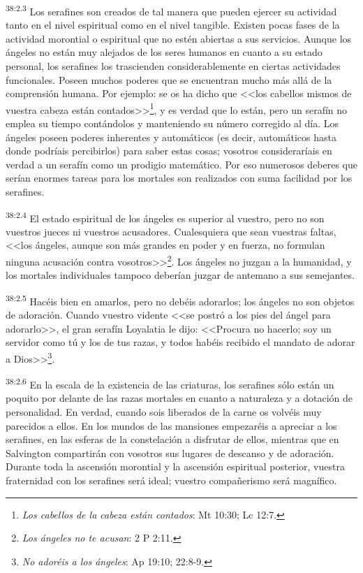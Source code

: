\par
\textsuperscript{38:2.3} Los serafines son creados de tal manera que pueden ejercer su actividad tanto en el nivel espiritual como en el nivel tangible. Existen pocas fases de la actividad morontial o espiritual que no estén abiertas a sus servicios. Aunque los ángeles no están muy alejados de los seres humanos en cuanto a su estado personal, los serafines los trascienden considerablemente en ciertas actividades funcionales. Poseen muchos poderes que se encuentran mucho más allá de la comprensión humana. Por ejemplo: se os ha dicho que <<los cabellos mismos de vuestra cabeza están contados>>\footnote{\textit{Los cabellos de la cabeza están contados}: Mt 10:30; Lc 12:7.}, y es verdad que lo están, pero un serafín no emplea su tiempo contándolos y manteniendo su número corregido al día. Los ángeles poseen poderes inherentes y automáticos (es decir, automáticos hasta donde podríais percibirlos) para saber estas cosas; vosotros consideraríais en verdad a un serafín como un prodigio matemático. Por eso numerosos deberes que serían enormes tareas para los mortales son realizados con suma facilidad por los serafines.

\par
\textsuperscript{38:2.4} El estado espiritual de los ángeles es superior al vuestro, pero no son vuestros jueces ni vuestros acusadores. Cualesquiera que sean vuestras faltas, <<los ángeles, aunque son más grandes en poder y en fuerza, no formulan ninguna acusación contra vosotros>>\footnote{\textit{Los ángeles no te acusan}: 2 P 2:11.}. Los ángeles no juzgan a la humanidad, y los mortales individuales tampoco deberían juzgar de antemano a sus semejantes.

\par
\textsuperscript{38:2.5} Hacéis bien en amarlos, pero no debéis adorarlos; los ángeles no son objetos de adoración. Cuando vuestro vidente <<se postró a los pies del ángel para adorarlo>>, el gran serafín Loyalatia le dijo: <<Procura no hacerlo; soy un servidor como tú y los de tus razas, y todos habéis recibido el mandato de adorar a Dios>>\footnote{\textit{No adoréis a los ángeles}: Ap 19:10; 22:8-9.}.

\par
\textsuperscript{38:2.6} En la escala de la existencia de las criaturas, los serafines sólo están un poquito por delante de las razas mortales en cuanto a naturaleza y a dotación de personalidad. En verdad, cuando sois liberados de la carne os volvéis muy parecidos a ellos. En los mundos de las mansiones empezaréis a apreciar a los serafines, en las esferas de la constelación a disfrutar de ellos, mientras que en Salvington compartirán con vosotros sus lugares de descanso y de adoración. Durante toda la ascensión morontial y la ascensión espiritual posterior, vuestra fraternidad con los serafines será ideal; vuestro compañerismo será magnífico.

